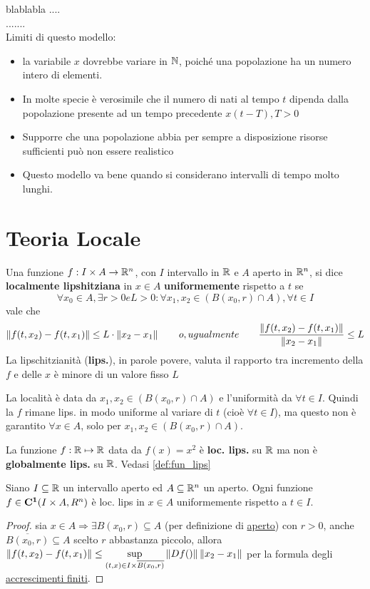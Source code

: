 blablabla ....\\
.......\\
Limiti di questo modello:
\begin{itemize}
	\item la variabile $x$ dovrebbe variare in $\mathbb{N}$, poiché una popolazione ha un numero intero di elementi.
	\item In molte specie è verosimile che il numero di nati al tempo $t$ dipenda dalla popolazione presente ad un tempo precedente $x(t-T), T>0$
	\item Supporre che una popolazione abbia per sempre a disposizione risorse sufficienti può non essere realistico
	\item Questo modello va bene quando si considerano intervalli di tempo molto lunghi.
\end{itemize}

\section{Teoria Locale}
\begin{definition}
	Una funzione $f:I\times A\to \mathbb{R}^n$, con $I$ intervallo in $\mathbb{R}$ e $A$ aperto in $\mathbb{R}^n$, si dice \textbf{localmente lipshitziana} in $x\in A$ \textbf{uniformemente} rispetto a $t$ se
	$$\forall x_0 \in A, \exists r>0 e L>0: \forall x_1,x_2 \in (B(x_0,r)\cap A), \forall t\in I$$
	vale che
	$$\left\|f(t,x_2)-f(t,x_1)\right\|\leq L\cdot\left\|x_2-x_1\right\|\qquad o, ugualmente\qquad\frac{\left\|f(t,x_2)-f(t,x_1)\right\|}{\left\|x_2-x_1\right\|}\leq L$$
	La lipschitzianità (\textbf{lips.}), in parole povere, valuta il rapporto tra incremento della $f$ e delle $x$ è minore di un valore fisso $L$
\end{definition}
\begin{note}
	La località è data da $x_1,x_2 \in (B(x_0,r)\cap A)$ e l'uniformità da $\forall t\in I$. Quindi la $f$ rimane lips. in modo uniforme al variare di $t$ (cioè $\forall t\in I$), ma questo non è garantito $\forall x\in A$, solo per $x_1,x_2 \in (B(x_0,r)\cap A)$.
\end{note}
\begin{example}
	La funzione $f:\mathbb{R}\mapsto\mathbb{R}$ data da $f(x)=x^2$ è \textbf{loc. lips.} su $\mathbb{R}$ ma non è \textbf{globalmente lips.} su $\mathbb{R}$. Vedasi \ref{def:fun_lips}
\end{example}
\begin{proposition}
	Siano $I\subseteq \mathbb{R}$ un intervallo aperto ed $A\subseteq \mathbb{R}^n$ un aperto. Ogni funzione $f\in \mathbf{C^{1}}(I\times A,R^n)$ è loc. lips in $x\in A$ uniformemente rispetto a $t\in I$.
	\begin{proof}
		sia $x\in A \Rightarrow \exists B(x_0,r)\subseteq A$ (per definizione di 
		\hyperref[def:aperto]{aperto}) con $r>0$, anche $\overline{B(x_0,r)}\subseteq A$ scelto $r$ abbastanza piccolo, allora $\left\|f(t,x_2)-f(t,x_1)\right\|\le\sup\limits_{(t,x)\in I\times \overline{B(x_0,r)}}\left\|Df()\right\|\left\|x_2-x_1\right\|  $ per la formula degli \hyperref[thm:accresc_fin]{accrescimenti finiti}.
	\end{proof}
\end{proposition}

